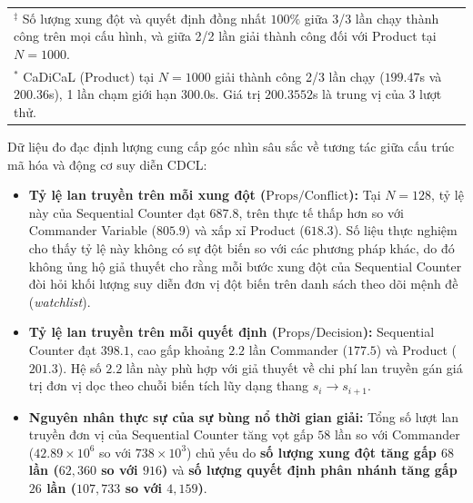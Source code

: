 \documentclass[a4paper,fleqn]{cas-sc}
\begin{document}
\begin{enumerate}
\begin{table}[htbp]
{\begin{tabular}{llr rrrr rrrr}
\bottomrule
\multicolumn{11}{l}{\footnotesize $^\ddagger$ Số lượng xung đột và quyết định đồng nhất $100\%$ giữa 3/3 lần chạy thành công trên mọi cấu hình, và giữa 2/2 lần giải thành công đối với Product tại $N=1000$.} \\
\multicolumn{11}{l}{\footnotesize $^*$ CaDiCaL (Product) tại $N=1000$ giải thành công 2/3 lần chạy ($199.47$s và $200.36$s), 1 lần chạm giới hạn 300.0s. Giá trị $200.3552$s là trung vị của 3 lượt thử.} \\
\end{tabular}%
}
\end{table}

    Dữ liệu đo đạc định lượng cung cấp góc nhìn sâu sắc về tương tác giữa cấu trúc mã hóa và động cơ suy diễn CDCL:
    \begin{itemize}
        \item \textbf{Tỷ lệ lan truyền trên mỗi xung đột ($\text{Props} / \text{Conflict}$):} Tại $N=128$, tỷ lệ này của Sequential Counter đạt $687.8$, trên thực tế thấp hơn so với Commander Variable ($805.9$) và xấp xỉ Product ($618.3$). Số liệu thực nghiệm cho thấy tỷ lệ này không có sự đột biến so với các phương pháp khác, do đó không ủng hộ giả thuyết cho rằng mỗi bước xung đột của Sequential Counter đòi hỏi khối lượng suy diễn đơn vị đột biến trên danh sách theo dõi mệnh đề (\textit{watchlist}).
        \item \textbf{Tỷ lệ lan truyền trên mỗi quyết định ($\text{Props} / \text{Decision}$):} Sequential Counter đạt $398.1$, cao gấp khoảng $2.2$ lần Commander ($177.5$) và Product ($201.3$). Hệ số $2.2$ lần này phù hợp với giả thuyết về chi phí lan truyền gán giá trị đơn vị dọc theo chuỗi biến tích lũy dạng thang $s_i \to s_{i+1}$.
        \item \textbf{Nguyên nhân thực sự của sự bùng nổ thời gian giải:} Tổng số lượt lan truyền đơn vị của Sequential Counter tăng vọt gấp $58$ lần so với Commander ($42.89 \times 10^6$ so với $738 \times 10^3$) chủ yếu do \textbf{số lượng xung đột tăng gấp $68$ lần ($62{,}360$ so với $916$)} và \textbf{số lượng quyết định phân nhánh tăng gấp $26$ lần ($107{,}733$ so với $4{,}159$)}.
    \end{itemize}

\end{enumerate}
\end{document}
